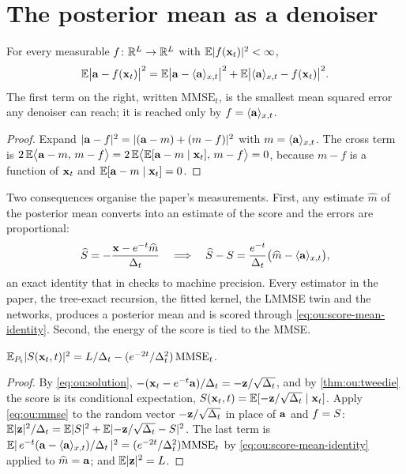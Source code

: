 \section{The posterior mean as a denoiser}
\label{sec:ou:denoiser}

\begin{proposition}
\label{prop:ou:mmse}
For every measurable $f\colon\mathbb{R}^{L}\to\mathbb{R}^{L}$ with $\mathbb{E}|f(\mathbf{x}_t)|^2<\infty$,
\begin{equation}
  \mathbb{E}\bigl|\mathbf{a}-f(\mathbf{x}_t)\bigr|^2=\mathbb{E}\bigl|\mathbf{a}-\langle \mathbf{a} \rangle_{x,t}\bigr|^2+\mathbb{E}\bigl|\langle \mathbf{a} \rangle_{x,t}-f(\mathbf{x}_t)\bigr|^2 .
  \label{eq:ou:mmse}
\end{equation}
The first term on the right, written $\mathrm{MMSE}_t$, is the smallest mean squared
error any denoiser can reach; it is reached only by $f=\langle \mathbf{a} \rangle_{x,t}$.
\end{proposition}

\begin{proof}
Expand $|\mathbf{a}-f|^2=|(\mathbf{a}-m)+(m-f)|^2$ with $m=\langle \mathbf{a} \rangle_{x,t}$. The cross term is
$2\,\mathbb{E}\bigl\langle\mathbf{a}-m,\,m-f\bigr\rangle=2\,\mathbb{E}\bigl\langle\mathbb{E}[\mathbf{a}-m\mid\mathbf{x}_t],\,m-f\bigr\rangle=0$,
because $m-f$ is a function of $\mathbf{x}_t$ and $\mathbb{E}[\mathbf{a}-m\mid\mathbf{x}_t]=0$.
\end{proof}

Two consequences organise the paper's measurements. First, any estimate
$\widehat{m}$ of the posterior mean converts into an estimate of the score and the
errors are proportional:
\begin{equation}
  \widehat{S}=-\frac{\mathbf{x}-e^{-t}\widehat{m}}{\Delta_t}
  \quad\Longrightarrow\quad
  \widehat{S}-S=\frac{e^{-t}}{\Delta_t}\bigl(\widehat{m}-\langle \mathbf{a} \rangle_{x,t}\bigr),
  \label{eq:ou:score-mean-identity}
\end{equation}
an exact identity that  in
 checks to machine precision. Every estimator in the
paper, the tree-exact recursion, the fitted kernel, the LMMSE twin and the networks,
produces a posterior mean and is scored through \cref{eq:ou:score-mean-identity}.
Second, the energy of the score is tied to the MMSE.

\begin{proposition}
\label{prop:ou:energy}
$\mathbb{E}_{P_t}|S(\mathbf{x}_t,t)|^2=L/\Delta_t-(e^{-2t}/\Delta_t^2)\,\mathrm{MMSE}_t$.
\end{proposition}

\begin{proof}
By \cref{eq:ou:solution}, $-(\mathbf{x}_t-e^{-t}\mathbf{a})/\Delta_t=-\mathbf{z}/\sqrt{\Delta_t}$, and by
\cref{thm:ou:tweedie} the score is its conditional expectation,
$S(\mathbf{x}_t,t)=\mathbb{E}[-\mathbf{z}/\sqrt{\Delta_t}\mid\mathbf{x}_t]$. Apply \cref{eq:ou:mmse} to the random
vector $-\mathbf{z}/\sqrt{\Delta_t}$ in place of $\mathbf{a}$ and $f=S$:
$\mathbb{E}|\mathbf{z}|^2/\Delta_t=\mathbb{E}|S|^2+\mathbb{E}|{-\mathbf{z}/\sqrt{\Delta_t}}-S|^2$. The last term is
$\mathbb{E}|\,e^{-t}(\mathbf{a}-\langle \mathbf{a} \rangle_{x,t})/\Delta_t\,|^2=(e^{-2t}/\Delta_t^2)\mathrm{MMSE}_t$ by
\cref{eq:ou:score-mean-identity} applied to $\widehat m=\mathbf{a}$; and $\mathbb{E}|\mathbf{z}|^2=L$.
\end{proof}

